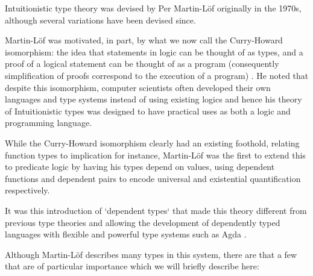           Intuitionistic type theory was devised by Per Martin-Löf
          \cite{martinlof1980} originally in the 1970s, although
          several variations have been devised since.

          Martin-Löf was motivated, in part, by what we now call the
          Curry-Howard isomorphism: the idea that statements in logic can be
          thought of as types, and a proof of a logical statement can
          be thought of as a program (consequently simplification of
          proofs correspond to the execution of a program)
          \cite{wadler2015}. He noted that despite this isomorphism,
          computer scientists often developed their own
          languages and type systems instead of using existing
          logics and hence his theory of Intuitionistic types was
          designed to have practical uses as both a logic and
          programming language.

          While the Curry-Howard isomorphism clearly had an existing
          foothold, relating function types to implication for
          instance, Martin-Löf was the first to extend this to
          predicate logic by having his types depend on values,
          using dependent functions and dependent pairs to encode
          universal and existential quantification respectively.

          It was this introduction of `dependent types` that made this
          theory different from previous type theories and allowing
          the development of dependently typed languages with flexible
          and powerful type systems such as Agda \cite{norell}.

          Although Martin-Löf describes many types in this system,
          there are that a few that are of particular importance which we will
          briefly describe here: 

